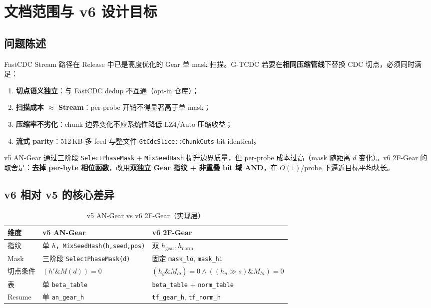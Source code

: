 \chapter{文档范围与 v6 设计目标}
\label{ch:scope}

\section{问题陈述}

FastCDC Stream 路径在 Release 中已是高度优化的 Gear 单 mask 扫描。G-TCDC 若要在\textbf{相同压缩管线}下替换 CDC 切点，必须同时满足：
\begin{enumerate}[nosep]
  \item \textbf{切点语义独立}：与 FastCDC dedup 不互通（opt-in 仓库）；
  \item \textbf{扫描成本 $\approx$ Stream}：per-probe 开销不得显著高于单 mask；
  \item \textbf{压缩率不劣化}：chunk 边界变化不应系统性降低 LZ4/Auto 压缩收益；
  \item \textbf{流式 parity}：512\,KB 多 feed 与整文件 \texttt{GtCdcSlice::ChunkCuts} bit-identical。
\end{enumerate}

v5 AN-Gear 通过三阶段 \texttt{SelectPhaseMask} + \texttt{MixSeedHash} 提升边界质量，但 per-probe 成本过高（mask 随距离 $d$ 变化）。v6 2F-Gear 的取舍是：\textbf{去掉 per-byte 相位函数}，改用\textbf{双独立 Gear 指纹 + 非重叠 bit 域 AND}，在 $O(1)$/probe 下逼近目标平均块长。

\section{v6 相对 v5 的核心差异}

\begin{table}[htbp]
\centering
\caption{v5 AN-Gear vs v6 2F-Gear（实现层）}
\label{tab:v5-v6-diff}
\small
\begin{tabular}{@{}p{3.2cm}p{5.2cm}p{5.2cm}@{}}
\toprule
\textbf{维度} & \textbf{v5 AN-Gear} & \textbf{v6 2F-Gear} \\
\midrule
指纹 & 单 $h$，\texttt{MixSeedHash(h,seed,pos)} & 双 $h_{\mathrm{gear}}, h_{\mathrm{norm}}$ \\
Mask & 三阶段 \texttt{SelectPhaseMask(d)} & 固定 \texttt{mask\_lo}, \texttt{mask\_hi} \\
切点条件 & $(h' \mathbin{\&} M(d)) = 0$ & $(h_g \mathbin{\&} M_{lo})=0 \land ((h_n \gg s)\mathbin{\&} M_{hi})=0$ \\
表 & 单 \texttt{beta\_table} & \texttt{beta\_table} + \texttt{norm\_table} \\
Resume & 单 \texttt{an\_gear\_h} & \texttt{tf\_gear\_h}, \texttt{tf\_norm\_h} \\
\bottomrule
\end{tabular}
\end{table}

